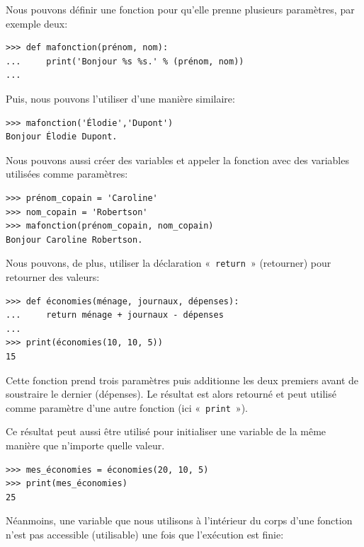 Nous pouvons définir une fonction pour qu'elle prenne plusieurs paramètres, par exemple deux:

\begin{Verbatim}[frame=single,rulecolor=\color{mbleu}, label=à taper]
>>> def mafonction(prénom, nom):
...     print('Bonjour %s %s.' % (prénom, nom))
...
\end{Verbatim}

Puis, nous pouvons l'utiliser d'une manière similaire:

\begin{Verbatim}[frame=single,rulecolor=\color{mbleu}, label=à taper]
>>> mafonction('Élodie','Dupont')
Bonjour Élodie Dupont.
\end{Verbatim}

Nous pouvons aussi créer des variables et appeler la fonction avec des variables utilisées comme paramètres:

\begin{Verbatim}[frame=single,rulecolor=\color{mbleu}, label=à taper]
>>> prénom_copain = 'Caroline'
>>> nom_copain = 'Robertson'
>>> mafonction(prénom_copain, nom_copain)
Bonjour Caroline Robertson.
\end{Verbatim}

Nous pouvons, de plus, utiliser la déclaration «~\texttt{return}~» (retourner) pour retourner des valeurs:

\begin{Verbatim}[frame=single,rulecolor=\color{mbleu}, label=à taper]
>>> def économies(ménage, journaux, dépenses):
...     return ménage + journaux - dépenses
...
>>> print(économies(10, 10, 5))
15
\end{Verbatim}

Cette fonction prend trois paramètres puis additionne les deux premiers avant de soustraire le dernier (dépenses). Le résultat est alors retourné et peut utilisé comme paramètre d'une autre fonction (ici «~\texttt{print}~»).

Ce résultat peut aussi être utilisé pour initialiser une variable de la même manière que n'importe quelle valeur.

\begin{Verbatim}[frame=single,rulecolor=\color{mbleu}, label=à taper]
>>> mes_économies = économies(20, 10, 5)
>>> print(mes_économies)
25
\end{Verbatim}

Néanmoins, une variable que nous utilisons à l'intérieur du corps d'une fonction n'est pas accessible (utilisable) une fois que l'exécution est finie:

